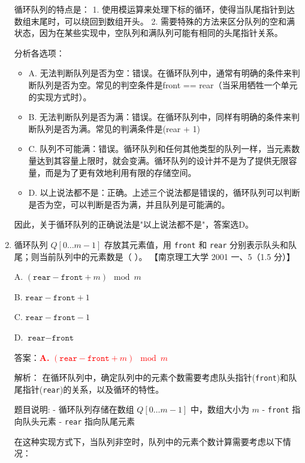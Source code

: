\documentclass[lang=cn,newtx,10pt,scheme=chinese]{../../../elegantbook}
\begin{document}
\begin{enumerate}
    循环队列的特点是：
    1. 使用模运算来处理下标的循环，使得当队尾指针到达数组末尾时，可以绕回到数组开头。
    2. 需要特殊的方法来区分队列的空和满状态，因为在某些实现中，空队列和满队列可能有相同的头尾指针关系。

    分析各选项：
    \begin{itemize}
        \item A. 无法判断队列是否为空：错误。在循环队列中，通常有明确的条件来判断队列是否为空。常见的判空条件是front == rear（当采用牺牲一个单元的实现方式时）。
        
        \item B. 无法判断队列是否为满：错误。在循环队列中，同样有明确的条件来判断队列是否为满。常见的判满条件是(rear + 1) %
        
        \item C. 队列不可能满：错误。循环队列和任何其他类型的队列一样，当元素数量达到其容量上限时，就会变满。循环队列的设计并不是为了提供无限容量，而是为了更有效地利用有限的存储空间。
        
        \item D. 以上说法都不是：正确。上述三个说法都是错误的，循环队列可以判断是否为空，可以判断是否为满，并且队列是可能满的。
    \end{itemize}

    因此，关于循环队列的正确说法是"以上说法都不是"，答案选D。

    \item 循环队列 $Q[0 \ldots m-1]$ 存放其元素值，用 \texttt{front} 和 \texttt{rear} 分别表示队头和队尾；则当前队列中的元素数是（ ）。  
    【南京理工大学 2001 一、5（1.5 分）】  

    A. $(\texttt{rear} - \texttt{front} + m) \mod m$  

    B. $\texttt{rear} - \texttt{front} + 1$  

    C. $\texttt{rear} - \texttt{front} - 1$  

    D. $\texttt{rear} - \texttt{front}$  

    答案：\textcolor{red}{\textbf{A.} $(\texttt{rear} - \texttt{front} + m) \mod m$}

    解析：
    在循环队列中，确定队列中的元素个数需要考虑队头指针(\texttt{front})和队尾指针(\texttt{rear})的关系，以及循环的特性。
    
    题目说明:
    - 循环队列存储在数组 $Q[0 \ldots m-1]$ 中，数组大小为 $m$
    - \texttt{front} 指向队头元素
    - \texttt{rear} 指向队尾元素
    
    在这种实现方式下，当队列非空时，队列中的元素个数计算需要考虑以下情况：
    

\end{enumerate}
\end{document}
